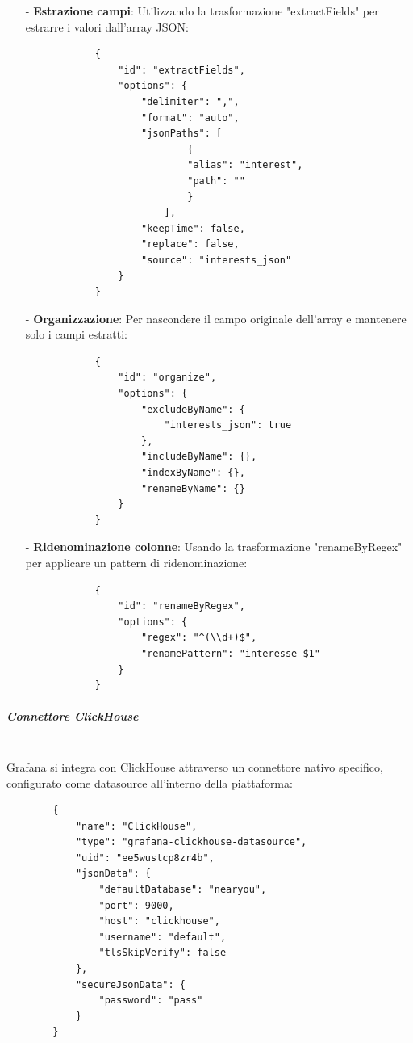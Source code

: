 \documentclass[10pt]{article}
\newcommand{\mysubparagraph}[1]{\subparagraph{#1}\mbox{}\\}
\begin{document}
        \begin{itemize}
            \item[-] \textbf{Estrazione campi}: Utilizzando la trasformazione "extractFields" per estrarre i valori dall'array JSON:
            \begin{lstlisting}
            {
                "id": "extractFields",
                "options": {
                    "delimiter": ",",
                    "format": "auto",
                    "jsonPaths": [
                            {
                            "alias": "interest",
                            "path": ""
                            }
                        ],
                    "keepTime": false,
                    "replace": false,
                    "source": "interests_json"
                }
            }
            \end{lstlisting}
            
            \item[-] \textbf{Organizzazione}: Per nascondere il campo originale dell'array e mantenere solo i campi estratti:
            \begin{lstlisting}
            {
                "id": "organize",
                "options": {
                    "excludeByName": {
                        "interests_json": true
                    },
                    "includeByName": {},
                    "indexByName": {},
                    "renameByName": {}
                }
            }
            \end{lstlisting}
            
            \item[-] \textbf{Ridenominazione colonne}: Usando la trasformazione "renameByRegex" per applicare un pattern di ridenominazione:
            \begin{lstlisting}
            {
                "id": "renameByRegex",
                "options": {
                    "regex": "^(\\d+)$",
                    "renamePattern": "interesse $1"
                }
            }
            \end{lstlisting}
        \end{itemize}


        \mysubparagraph{Connettore ClickHouse}
        Grafana si integra con ClickHouse attraverso un connettore nativo specifico, configurato come datasource all'interno della piattaforma:
        
        \begin{lstlisting}
        {
            "name": "ClickHouse",
            "type": "grafana-clickhouse-datasource",
            "uid": "ee5wustcp8zr4b",
            "jsonData": {
                "defaultDatabase": "nearyou",
                "port": 9000,
                "host": "clickhouse",
                "username": "default",
                "tlsSkipVerify": false
            },
            "secureJsonData": {
                "password": "pass"
            }
        }
        \end{lstlisting}
        
\end{document}
